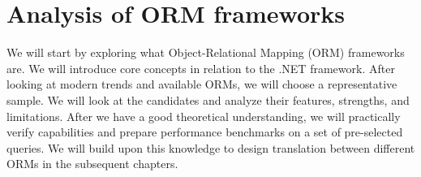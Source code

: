 \chapter{Analysis of ORM frameworks}
\label{chapter:ormcomparison}

We will start by exploring what Object-Relational Mapping (ORM) frameworks are. We will introduce core concepts in relation to the .NET framework. After looking at modern trends and available ORMs, we will choose a representative sample. We will look at the candidates and analyze their features, strengths, and limitations. After we have a good theoretical understanding, we will practically verify capabilities and prepare performance benchmarks on a set of pre-selected queries. We will build upon this knowledge to design translation between different ORMs in the subsequent chapters.







